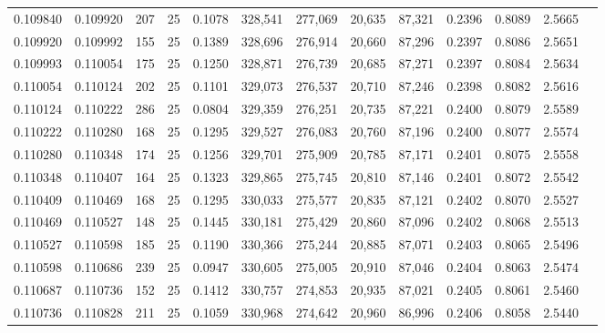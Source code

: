 \begin{tabular}{rrrrrrrrrrrrr}
0.109840 & 0.109920 &   207 &  25 &                                     0.1078 & 328,541 & 277,069 &  20,635 &  87,321 & 0.2396 & 0.8089 & 2.5665 \\
0.109920 & 0.109992 &   155 &  25 &                                     0.1389 & 328,696 & 276,914 &  20,660 &  87,296 & 0.2397 & 0.8086 & 2.5651 \\
0.109993 & 0.110054 &   175 &  25 &                                     0.1250 & 328,871 & 276,739 &  20,685 &  87,271 & 0.2397 & 0.8084 & 2.5634 \\
0.110054 & 0.110124 &   202 &  25 &                                     0.1101 & 329,073 & 276,537 &  20,710 &  87,246 & 0.2398 & 0.8082 & 2.5616 \\
0.110124 & 0.110222 &   286 &  25 &                                     0.0804 & 329,359 & 276,251 &  20,735 &  87,221 & 0.2400 & 0.8079 & 2.5589 \\
0.110222 & 0.110280 &   168 &  25 &                                     0.1295 & 329,527 & 276,083 &  20,760 &  87,196 & 0.2400 & 0.8077 & 2.5574 \\
0.110280 & 0.110348 &   174 &  25 &                                     0.1256 & 329,701 & 275,909 &  20,785 &  87,171 & 0.2401 & 0.8075 & 2.5558 \\
0.110348 & 0.110407 &   164 &  25 &                                     0.1323 & 329,865 & 275,745 &  20,810 &  87,146 & 0.2401 & 0.8072 & 2.5542 \\
0.110409 & 0.110469 &   168 &  25 &                                     0.1295 & 330,033 & 275,577 &  20,835 &  87,121 & 0.2402 & 0.8070 & 2.5527 \\
0.110469 & 0.110527 &   148 &  25 &                                     0.1445 & 330,181 & 275,429 &  20,860 &  87,096 & 0.2402 & 0.8068 & 2.5513 \\
0.110527 & 0.110598 &   185 &  25 &                                     0.1190 & 330,366 & 275,244 &  20,885 &  87,071 & 0.2403 & 0.8065 & 2.5496 \\
0.110598 & 0.110686 &   239 &  25 &                                     0.0947 & 330,605 & 275,005 &  20,910 &  87,046 & 0.2404 & 0.8063 & 2.5474 \\
0.110687 & 0.110736 &   152 &  25 &                                     0.1412 & 330,757 & 274,853 &  20,935 &  87,021 & 0.2405 & 0.8061 & 2.5460 \\
0.110736 & 0.110828 &   211 &  25 &                                     0.1059 & 330,968 & 274,642 &  20,960 &  86,996 & 0.2406 & 0.8058 & 2.5440 \\

\end{tabular}
